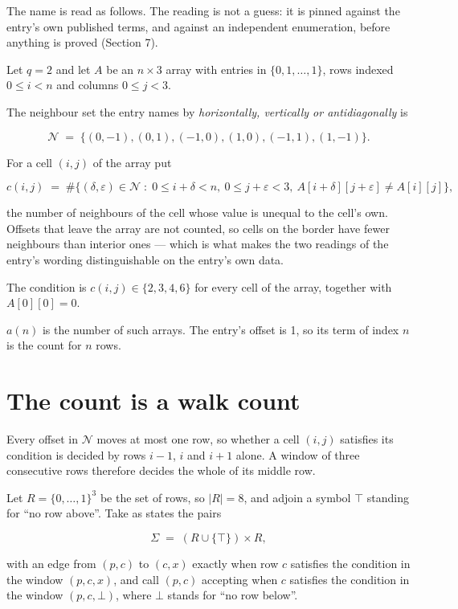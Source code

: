 \documentclass[11pt]{article}
\theoremstyle{definition}
\begin{document}
The name is read as follows. The reading is not a guess: it is pinned against the entry's own published terms, and against an independent enumeration, before anything is proved (Section 7).

Let $q = 2$ and let $A$ be an $n \times 3$ array with entries in $\{0,1,\dots,1\}$, rows indexed $0 \le i < n$ and columns $0 \le j < 3$.

The neighbour set the entry names by {\itshape horizontally, vertically or antidiagonally} is

\[\mathcal{N} \;=\; \{(0,-1), (0,1), (-1,0), (1,0), (-1,1), (1,-1)\}.\]

For a cell $(i,j)$ of the array put

\[c(i,j) \;=\; \#\bigl\{(\delta,\varepsilon)\in\mathcal{N} \;:\; 0\le i+\delta<n,\ 0\le j+\varepsilon<3,\ A[i+\delta][j+\varepsilon] \neq A[i][j]\bigr\},\]

the number of neighbours of the cell whose value is unequal to the cell's own. Offsets that leave the array are not counted, so cells on the border have fewer neighbours than interior ones --- which is what makes the two readings of the entry's wording distinguishable on the entry's own data.

The condition is $c(i,j) \in \{2, 3, 4, 6\}$ for every cell of the array, together with $A[0][0]=0$.

$a(n)$ is the number of such arrays. The entry's offset is 1, so its term of index $n$ is the count for $n$ rows.

\section{The count is a walk count}

Every offset in $\mathcal{N}$ moves at most one row, so whether a cell $(i,j)$ satisfies its condition is decided by rows $i-1$, $i$ and $i+1$ alone. A window of three consecutive rows therefore decides the whole of its middle row.

Let $R = \{0,\dots,1\}^{3}$ be the set of rows, so $|R| = 8$, and adjoin a symbol $\top$ standing for ``no row above''. Take as states the pairs

\[\Sigma \;=\; (R \cup \{\top\}) \times R,\]

with an edge from $(p,c)$ to $(c,x)$ exactly when row $c$ satisfies the condition in the window $(p,c,x)$, and call $(p,c)$ accepting when $c$ satisfies the condition in the window $(p,c,\bot)$, where $\bot$ stands for ``no row below''.
\end{document}
